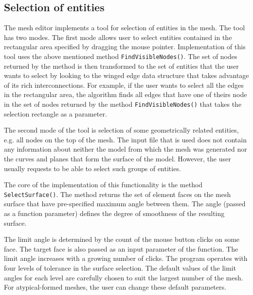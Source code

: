 
\subsection{Selection of entities}

The mesh editor implements a tool for selection of entities in the mesh. The tool has two modes. The first mode allows user to select entities contained in the rectangular area specified by dragging the mouse pointer. Implementation of this tool uses the above mentioned method \texttt{FindVisibleNodes()}. The set of nodes returned by the method is then transformed to the set of entities that the user wants to select by looking to the winged edge data structure that takes advantage of its rich interconnections. For example, if the user wants to select all the edges in the rectangular area, the algorithm finds all edges that have one of theirs node in the set of nodes returned by the method \texttt{FindVisibleNodes()} that takes the selection rectangle as a parameter.

The second mode of the tool is selection of some geometrically related entities, e.g. all nodes on the top of the mesh. The input file that is used does not contain any information about neither the model from which the mesh was generated nor the curves and planes that form the surface of the model. However, the user usually requests to be able to select such groups of entities.

The core of the implementation of this functionality is the method \texttt{SelectSurface()}. The method returns the set of element faces on the mesh surface that have pre-specified maximum angle between them. The angle (passed as a function parameter) defines the degree of smoothness of the resulting surface.

The limit angle is determined by the count of the mouse button clicks on some face. The target face is also passed as an input parameter of the function. The limit angle increases with a growing number of clicks. The program operates with four levels of tolerance in the surface selection. The default values of the limit angles for each level are carefully chosen to suit the largest number of the mesh. For atypical-formed meshes, the user can change these default parameters.

